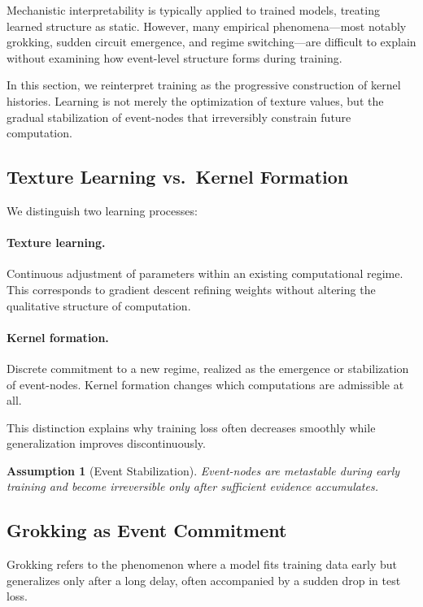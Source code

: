 \documentclass[11pt]{article}
\newtheorem{assumption}{Assumption}
\theoremstyle{remark}
\begin{document}
Mechanistic interpretability is typically applied to trained models,
treating learned structure as static. However, many empirical
phenomena—most notably grokking, sudden circuit emergence, and regime
switching—are difficult to explain without examining how event-level
structure forms during training.

In this section, we reinterpret training as the progressive
construction of kernel histories. Learning is not merely the
optimization of texture values, but the gradual stabilization of
event-nodes that irreversibly constrain future computation.

\subsection{Texture Learning vs.\ Kernel Formation}

We distinguish two learning processes:

\paragraph{Texture learning.}
Continuous adjustment of parameters within an existing computational
regime. This corresponds to gradient descent refining weights without
altering the qualitative structure of computation.

\paragraph{Kernel formation.}
Discrete commitment to a new regime, realized as the emergence or
stabilization of event-nodes. Kernel formation changes which
computations are admissible at all.

This distinction explains why training loss often decreases smoothly
while generalization improves discontinuously.

\begin{assumption}[Event Stabilization]
Event-nodes are metastable during early training and become
irreversible only after sufficient evidence accumulates.
\end{assumption}

\subsection{Grokking as Event Commitment}

Grokking refers to the phenomenon where a model fits training data
early but generalizes only after a long delay, often accompanied by a
sudden drop in test loss.
\end{document}
